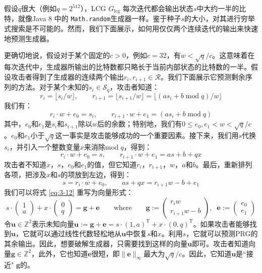 \begin{snote}[密码分析。]
假设$q$很大（例如$q=2^{512}$），LCG $G_\mathrm{lcg}$ 每次迭代都会输出状态$s$中大约一半的比特，就像Java 8 中的 \texttt{Math.random}生成器一样。鉴于种子$s$的大小，对其进行穷举式搜索是不可能的。然而，我们下面展示，如何用仅仅两个连续迭代的输出来快速地预测生成器。

更确切地说，假设对于某个固定的$c>0$，例如$c=32$，有$w<\sqrt{q}/c$。这意味着在每次迭代中，生成器所输出的比特数都只略长于当前内部状态的比特数的一半。假设攻击者得到了生成器的连续两个输出$r_i,r_{i+1}\in\mathcal{R}$。我们下面展示它预测剩余序列的方法。对于某个未知的$s_i\in\mathcal{S}_q$，攻击者知道：
\[
r_i=\lfloor s_i/w\rfloor,\quad\quad
r_{i+1}=\lfloor s_{i+1}/w\rfloor=\lfloor(as_i+b\;\mathrm{mod}\;q)/w\rfloor
\]
我们有：
\[
r_i\cdot w+e_0=s_i,\quad\quad
r_{i+1}\cdot w+e_1=(as_i+b\;\mathrm{mod}\;q)
\]
其中，$e_0$和$e_1$是$s_i$和$s_{i+1}$除以$w$后的余数；特别地，我们有$0\leq e_0,e_1<w<\sqrt{q}/c$。$e_0$和$e_1$小于$\sqrt{q}$这一事实是攻击能够成功的一个重要因素。接下来，我们用$s$代换$s_i$，并引入一个整数变量$x$来消除$\mathrm{mod}\;q$，得到：
\[
r_i\cdot w+e_0=s,\quad\quad
r_{i+1}\cdot w+e_1=as+b+qx
\]
攻击者不知道$x$，$s$，$e_0$和$e_1$的值，但它知道$r_i$，$r_{i+1}$，$w$，$a$和$b$。最后，重新排列各项，把涉及$x$和$s$的项放到左边，得到：
\begin{equation}\label{eq:3-12}
s=r_i\cdot w+e_0,\quad\quad
as+qx=r_{i+1}w-b+e_1
\end{equation}
我们可以将式 \ref{eq:3-12} 重写为向量形式：
\begin{equation}
s\cdot
\begin{pmatrix}
1\\a
\end{pmatrix}
+x\cdot
\begin{pmatrix}
0\\q
\end{pmatrix}
=\boldsymbol{g}+\boldsymbol{e}
\quad\quad\text{where}\quad\quad
\boldsymbol{g}:=
\begin{pmatrix}
r_iw\\r_{i+1}w-b
\end{pmatrix}
,\;\;
\boldsymbol{e}:=
\begin{pmatrix}
e_0\\e_1
\end{pmatrix}
\end{equation}
令$\boldsymbol{u}\in\mathbb{Z}^2$表示未知向量$\boldsymbol{u}:=\boldsymbol{g}+\boldsymbol{e}=s\cdot(1,a)^\mathrm{T}+x\cdot(0,q)^\mathrm{T}$。如果攻击者能够找到$\boldsymbol{u}$，它就可以通过线性代数轻松地从$\boldsymbol{u}$中恢复$s$和$x$。利用$s$，它就可以预测PRG的其余输出。因此，想要破解生成器，只需要找到这样的向量$\boldsymbol{u}$即可。攻击者知道向量$\boldsymbol{g}\in\mathbb{Z}^2$，此外，它也知道$\boldsymbol{e}$很短，即$\lVert\boldsymbol{e}\rVert_\infty$最大为$\sqrt{q}/c$。因此，它知道$\boldsymbol{u}$是``接近" $\boldsymbol{g}$的。


\end{snote}
